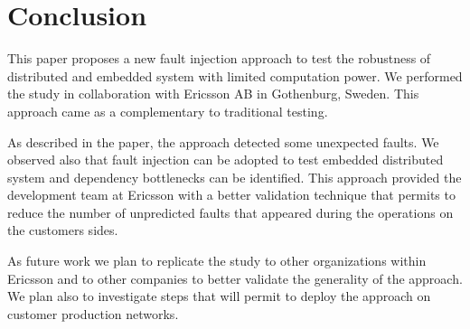\section{ Conclusion}\label{sec:conclusion}

This paper proposes a new fault injection approach to test the robustness of distributed and embedded system with limited computation power. We performed the study in collaboration with Ericsson AB in Gothenburg, Sweden.
This approach came as a complementary to traditional testing. 

As described in the paper,  the approach detected some unexpected faults. We observed also that fault injection can be adopted to test embedded distributed system and dependency bottlenecks can be identified. This approach provided the development team at Ericsson with 
a better validation technique that permits to reduce the number of %
unpredicted faults that appeared during the operations on the customers sides. %

As future work we plan to replicate the study to other organizations within Ericsson and to other companies  to better validate the generality of the approach. %
We plan also to investigate steps that will permit to deploy the approach on customer production networks.  

